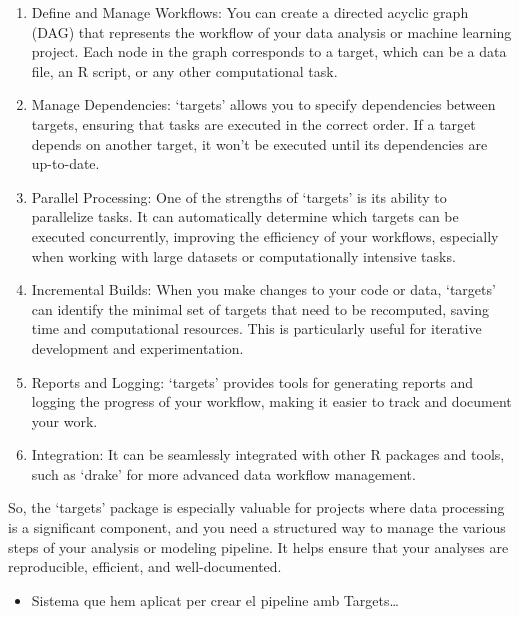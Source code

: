 \documentclass[a4paper, nobind]{templates/ociamthesis}
\providecommand{\tightlist}{%
  \setlength{\itemsep}{0pt}\setlength{\parskip}{0pt}}
\begin{document}
\begin{enumerate}
\def\labelenumi{\arabic{enumi}.}
\item
  Define and Manage Workflows: You can create a directed acyclic graph (DAG) that represents the workflow of your data analysis or machine learning project. Each node in the graph corresponds to a target, which can be a data file, an R script, or any other computational task.
\item
  Manage Dependencies: `targets' allows you to specify dependencies between targets, ensuring that tasks are executed in the correct order. If a target depends on another target, it won't be executed until its dependencies are up-to-date.
\item
  Parallel Processing: One of the strengths of `targets' is its ability to parallelize tasks. It can automatically determine which targets can be executed concurrently, improving the efficiency of your workflows, especially when working with large datasets or computationally intensive tasks.
\item
  Incremental Builds: When you make changes to your code or data, `targets' can identify the minimal set of targets that need to be recomputed, saving time and computational resources. This is particularly useful for iterative development and experimentation.
\item
  Reports and Logging: `targets' provides tools for generating reports and logging the progress of your workflow, making it easier to track and document your work.
\item
  Integration: It can be seamlessly integrated with other R packages and tools, such as `drake' for more advanced data workflow management.
\end{enumerate}

So, the `targets' package is especially valuable for projects where data processing is a significant component, and you need a structured way to manage the various steps of your analysis or modeling pipeline. It helps ensure that your analyses are reproducible, efficient, and well-documented.

\begin{itemize}
\tightlist
\item
  Sistema que hem aplicat per crear el pipeline amb Targets\ldots{}
\end{itemize}
\end{document}
